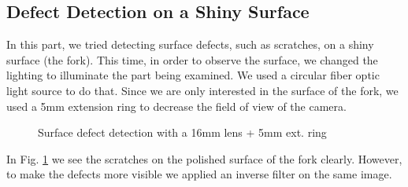 \documentclass[english]{article}
\begin{document}
\subsection{Defect Detection on a Shiny Surface}
In this part, we tried detecting surface defects,
such as scratches, on a shiny surface (the fork).
This time, in order to observe the surface, we changed the lighting to illuminate the part being examined.
We used a circular fiber optic light source to do that.
Since we are only interested in the surface of the fork, we used a 5mm extension ring to decrease the field of view of the camera.
\begin{figure}[H]
	\centering
	\caption{Surface defect detection with a 16mm lens + 5mm ext. ring}
	\label{fig:six}
\end{figure}
In Fig. \ref{fig:six} we see the scratches on the polished surface of the fork clearly.
However, to make the defects more visible we applied an inverse filter on the same image.
\end{document}
